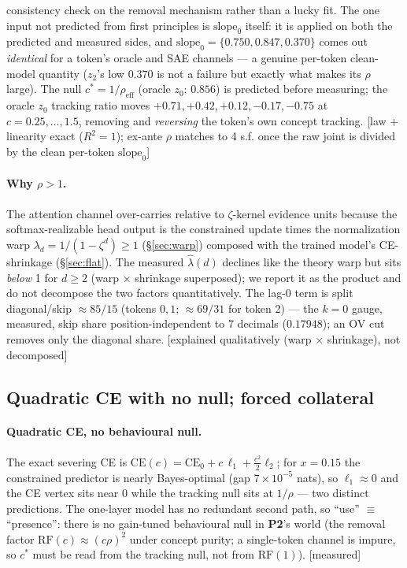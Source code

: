 \documentclass{article}
\newcommand{\htag}[1]{{\normalfont\sffamily\footnotesize[#1]}}
\newcommand{\Ptwo}{\textbf{P2}}
\begin{document}
consistency check on the removal mechanism rather than a lucky fit. The one input not
predicted from first principles is $\mathrm{slope}_0$ itself: it is applied on both the
predicted and measured sides, and $\mathrm{slope}_0=\{0.750,0.847,0.370\}$ comes out
\emph{identical} for a token's oracle and SAE channels --- a genuine per-token
clean-model quantity ($z_2$'s low $0.370$ is not a failure but exactly what makes its
$\rho$ large). The null $c^\ast=1/\rho_{\mathrm{eff}}$ (oracle $z_0$: $0.856$) is
predicted before measuring; the oracle $z_0$ tracking ratio moves
$+0.71,+0.42,+0.12,-0.17,-0.75$ at $c=0.25,\dots,1.5$, removing and \emph{reversing}
the token's own concept tracking. \htag{law + linearity exact ($R^2{=}1$); ex-ante
$\rho$ matches to 4 s.f. once the raw joint is divided by the clean per-token
$\mathrm{slope}_0$}

\paragraph{Why $\rho>1$.} The attention channel over-carries relative to
$\zeta$-kernel evidence units because the softmax-realizable head output is the
constrained update times the normalization warp $\lambda_d=1/(1-\zeta^d)\ge1$
(\S\ref{sec:warp}) composed with the trained model's CE-shrinkage (\S\ref{sec:flat}).
The measured $\hat\lambda(d)$ declines like the theory warp but sits \emph{below} 1
for $d\ge2$ (warp $\times$ shrinkage superposed); we report it as the product and do
not decompose the two factors quantitatively. The lag-0 term is split diagonal/skip
$\approx 85/15$ (tokens $0,1$; $\approx 69/31$ for token 2) --- the $k{=}0$ gauge, measured, skip
share position-independent to 7 decimals ($0.17948$); an OV cut removes only the
diagonal share. \htag{explained qualitatively (warp $\times$ shrinkage), not
decomposed}

\subsection{Quadratic CE with no null; forced collateral}\label{sec:collateral}

\paragraph{Quadratic CE, no behavioural null.} The exact severing CE is
$\mathrm{CE}(c)=\mathrm{CE}_0+c\,\ell_1+\tfrac{c^2}{2}\ell_2$; for $x=0.15$ the
constrained predictor is nearly Bayes-optimal (gap $7\times10^{-5}$ nats), so
$\ell_1\approx0$ and the CE vertex sits near $0$ while the tracking null sits at
$1/\rho$ --- two distinct predictions. The one-layer model has no redundant second
path, so ``use'' $\equiv$ ``presence'': there is no gain-tuned behavioural null in
\Ptwo's world (the removal factor $\mathrm{RF}(c)\approx(c\rho)^2$ under concept
purity; a single-token channel is impure, so $c^\ast$ must be read from the tracking
null, not from $\mathrm{RF}(1)$). \htag{measured}
\end{document}

